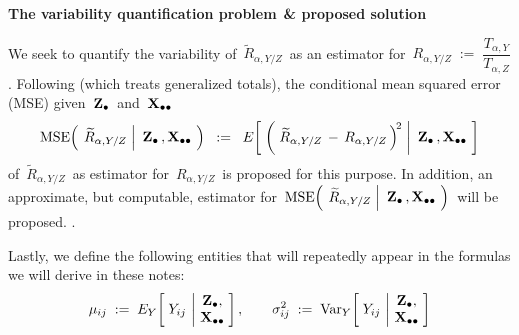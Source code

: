 \begin{center}
\begin{minipage}{5.5in}
\begin{tcolorbox}[arc=8px, colback=white, colframe=black]
\begin{center}
\textbf{The variability quantification problem$\overset{{\color{white}1}}{\textnormal{\color{white}.}}$\& proposed solution}
\end{center}
We seek to quantify the variability of
\,$\widetilde{R}_{\alpha,Y/Z}$\,
as an estimator for
\,$R_{\alpha,Y/Z} \; := \; \dfrac{T_{\alpha,Y}}{T_{\alpha,Z}}$.
\vskip 0.1cm
Following \cite{Beaumont2011} (which treats generalized totals),
the conditional mean squared error (MSE) given \,$\mathbf{Z}_{\bullet}$\, and \,$\mathbf{X}_{\bullet\bullet}$\,
\begin{equation*}
\textnormal{MSE}\!\left(\;
    \left.
    \widetilde{R}_{\alpha,Y/Z}
    \;\right\vert\!
    \begin{array}{c} \mathbf{Z}_{\bullet}\,,\mathbf{X}_{\bullet\bullet} \end{array}
    \!\right)
\;\; := \;\;
    E\!\left[\;\left(\,
        \left.
        \widetilde{R}_{\alpha,Y/Z}
        \, - \,
        R_{\alpha,Y/Z}
        \,\right)^{\!2}
        \;\right\vert\!
        \begin{array}{c} \mathbf{Z}_{\bullet}\,,\mathbf{X}_{\bullet\bullet} \end{array}
        \!\right]
\end{equation*}
of
\,$\widetilde{R}_{\alpha,Y/Z}$\,
as estimator for
\,$R_{\alpha,Y/Z}$\,
is proposed for this purpose.
\vskip 0.3cm
\noindent
In addition, an approximate, but computable, estimator for
\,$
\textnormal{MSE}\!\left(\;
    \left.
    \widetilde{R}_{\alpha,Y/Z}
    \;\right\vert\!
    \begin{array}{c} \mathbf{Z}_{\bullet}\,,\mathbf{X}_{\bullet\bullet} \end{array}
    \!\right)
$\,
will be proposed.
\vskip -0.25cm
{\color{white}.}
\end{tcolorbox}
\end{minipage}
\end{center}
\vskip 0.3cm
\noindent
Lastly, we define the following entities that will repeatedly appear
in the formulas we will derive in these notes:
\begin{equation*}
\mu_{ij}
\; := \;
    E_{Y}\!\left[\;
        Y_{ij}
        \,\left\vert\!
        \begin{array}{c} \Zdot, \\ \Xobs \end{array}
        \right.
        \!\!\right],
\quad\quad
\sigma_{ij}^{2}
\; := \;
    \Var_{Y}\!\left[\;
        Y_{ij}
        \,\left\vert\!
        \begin{array}{c} \Zdot, \\ \Xobs \end{array}
        \right.
        \!\!\right]
\end{equation*}

